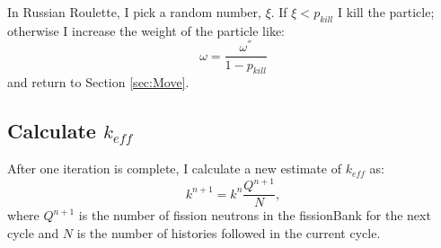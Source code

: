 \documentclass[11pt]{article}
\begin{document}
In Russian Roulette, I pick a random number, $\xi$.  If $\xi < p_{kill}$ I kill the particle; otherwise I increase the weight of the particle like:
\begin{equation}
    \omega = \frac{\omega^{''}}{1 - p_{kill}}
\end{equation}
and return to Section \ref{sec:Move}.

\subsection{Calculate $k_{eff}$}
After one iteration is complete, I calculate a new estimate of $k_{eff}$ as:
\begin{equation}
    k^{n+1} = k^n\frac{Q^{n+1}}{N},
\end{equation}
where $Q^{n+1}$ is the number of fission neutrons in the fissionBank for the next cycle and $N$ is the number of histories followed in the current cycle.
\end{document}
